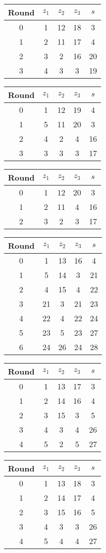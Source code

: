 \begin{multicols}{2}
\begin{tabular}{c | c | c | c | c }
Round & $z_1$ & $z_2$ & $z_3$ & $s$ \\
\hline
0 & 1 & 12 & 18 & 3 \\
1 & 2 & 11 & 17 & 4 \\
2 & 3 & 2 & 16 & 20 \\
3 & 4 & 3 & 3 & 19
\end{tabular}


\begin{tabular}{c | c | c | c | c }
Round & $z_1$ & $z_2$ & $z_3$ & $s$ \\
\hline
0 & 1 & 12 & 19 & 4 \\
1 & 5 & 11 & 20 & 3 \\
2 & 4 & 2 & 4 & 16 \\
3 & 3 & 3 & 3 & 17
\end{tabular}


\begin{tabular}{c | c | c | c | c }
Round & $z_1$ & $z_2$ & $z_3$ & $s$ \\
\hline
0 & 1 & 12 & 20 & 3 \\
1 & 2 & 11 & 4 & 16 \\
2 & 3 & 2 & 3 & 17
\end{tabular}


\begin{tabular}{c | c | c | c | c }
Round & $z_1$ & $z_2$ & $z_3$ & $s$ \\
\hline
0 & 1 & 13 & 16 & 4 \\
1 & 5 & 14 & 3 & 21 \\
2 & 4 & 15 & 4 & 22 \\
3 & 21 & 3 & 21 & 23 \\
4 & 22 & 4 & 22 & 24 \\
5 & 23 & 5 & 23 & 27 \\
6 & 24 & 26 & 24 & 28
\end{tabular}


\begin{tabular}{c | c | c | c | c }
Round & $z_1$ & $z_2$ & $z_3$ & $s$ \\
\hline
0 & 1 & 13 & 17 & 3 \\
1 & 2 & 14 & 16 & 4 \\
2 & 3 & 15 & 3 & 5 \\
3 & 4 & 3 & 4 & 26 \\
4 & 5 & 2 & 5 & 27
\end{tabular}


\begin{tabular}{c | c | c | c | c }
Round & $z_1$ & $z_2$ & $z_3$ & $s$ \\
\hline
0 & 1 & 13 & 18 & 3 \\
1 & 2 & 14 & 17 & 4 \\
2 & 3 & 15 & 16 & 5 \\
3 & 4 & 3 & 3 & 26 \\
4 & 5 & 4 & 4 & 27
\end{tabular}



\end{multicols}

